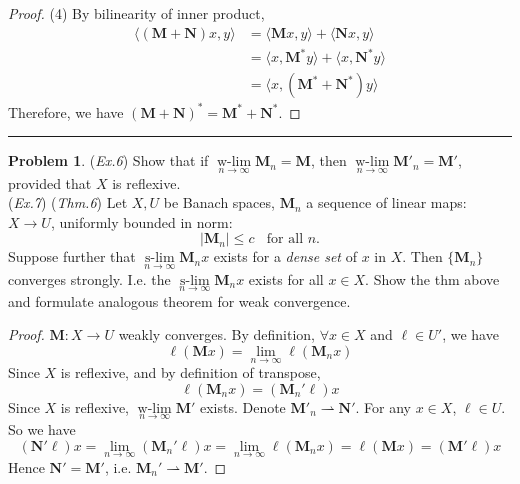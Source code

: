 \documentclass[a4paper, 10pt]{article}
\theoremstyle{definition}
\newtheorem{problem}{Problem}
\DeclareMathOperator{\wlim}{w-lim}
\DeclareMathOperator{\slim}{s-lim}
\theoremstyle{hSol}
\begin{document}
\begin{proof}
(4) By bilinearity of inner product,
\begin{equation}
	\begin{split}
		\langle (\bm{M+N})x, y \rangle &= \langle \bm{M}x, y \rangle + \langle \bm{N}x, y \rangle\\
		&= \langle x, \bm{M}^*y \rangle + \langle x, \bm{N}^*y \rangle\\
		&= \langle x, (\bm{M}^* + \bm{N}^*)y \rangle
	\end{split}
\end{equation}
Therefore, we have $(\bm{M}+\bm{N})^* = \bm{M}^* + \bm{N}^*$.
\end{proof}

\noindent\rule{16cm}{0.4pt}
\begin{problem} (\textit{Ex.6}) Show that if $\wlim\limits_{n\rightarrow\infty} \bm{M}_n = \bm{M}$, then $\wlim\limits_{n\rightarrow\infty} \bm{M}'_n = \bm{M}'$, provided that $X$ is reflexive. \\
(\textit{Ex.7}) (\textit{Thm.6}) Let $X,U$ be Banach spaces, $\bm{M}_n$ a sequence of linear maps: $X\to U$, uniformly bounded in norm:
$$
|\bm{M}_n| \leq c ~~~~ \text{for all $n$.}
$$
Suppose further that $\slim\limits_{n\rightarrow\infty}\bm{M}_n x$ exists for a \textit{dense set} of $x$ in $X$. Then $\{\bm{M}_n\}$ converges strongly. I.e. the $\slim\limits_{n\rightarrow\infty}\bm{M}_n x$ exists for all $x\in X$. Show the thm above and formulate analogous theorem for weak convergence.
\end{problem}
\begin{proof} $\bm{M}: X\to U$ weakly converges. By definition, $\forall x\in X$ and $\ell\in U'$, we have
$$
\ell(\bm{M}x) = \lim\limits_{n\rightarrow\infty} \ell(\bm{M}_n x)
$$
Since $X$ is reflexive, and by definition of transpose,
$$
\ell(\bm{M}_nx) = (\bm{M}_n'\ell) x
$$
Since $X$ is reflexive, $\wlim\limits_{n\rightarrow\infty}\bm{M}'$ exists. Denote $\bm{M}'_n \rightharpoonup \bm{N}'$. For any $x\in X$, $\ell\in U$. So we have
\begin{equation}
	(\bm{N}'\ell)x = \lim\limits_{n\rightarrow\infty} (\bm{M}_n'\ell) x = \lim\limits_{n\rightarrow\infty} \ell(\bm{M}_nx) = \ell(\bm{M}x) = (\bm{M}'\ell)x
\end{equation}
Hence $\bm{N}'=\bm{M}'$, i.e. $\bm{M}_n' \rightharpoonup \bm{M}'$.
\end{proof}

~\\
\end{document}

